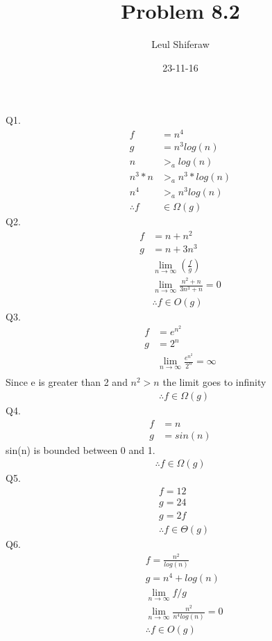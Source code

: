 \documentclass{article}
\title{Problem 8.2}
\author{Leul Shiferaw}
\date{23-11-16}
\begin{document}
	\maketitle
	\newpage
	\large
	Q1.
	\begin{align*}
		f &= n^4\\
		g &= n^3log(n)\\
		n &>_a log(n)\\
		n^3*n &>_a n^3*log(n)\\
		n^4 &>_a n^3log(n)\\
		\therefore f &\in \Omega (g)		
	\end{align*}
	Q2.
	\begin{align*}		
		f &= n + n^2\\
		g &= n + 3n^3\\
		&\lim_{n\to\infty}(\frac{f}{g})\\
		&\lim_{n\to\infty}\frac{n^2+n}{3n^3+n}=0\\
		&\therefore f\in O(g)
	\end{align*}
	Q3.
	\begin{align*}
		f &= e^{n^2}\\
		g &= 2^n\\
		&\lim_{n\to\infty}\frac{e^{n^2}}{2^n}=\infty\\
	\end{align*}
	Since e is greater than 2 and $n^2 > n$ the limit goes to infinity
	\begin{align*}
		&\therefore f\in\Omega(g)
	\end{align*}
	Q4.
	\begin{align*}
		f &= n\\
		g &= sin(n)
	\end{align*}
	sin(n) is bounded between 0 and 1.
	\begin{align*}
		\therefore f\in\Omega(g)
	\end{align*}
	\newpage
	Q5.
	\begin{align*}
		&f = 12\\
		&g = 24\\
		&g = 2f\\
		&\therefore f\in\Theta(g)
	\end{align*}
	Q6.
	\begin{align*}
		&f = \frac{n^2}{log(n)}\\
		&g = n^4 + log(n)\\
		&\lim_{n\to\infty}{f/g}\\
		&\lim_{n\to\infty}{\frac{n^2}{n^4log(n)}}=0\\
		&\therefore f\in O(g)
	\end{align*}
\end{document}
